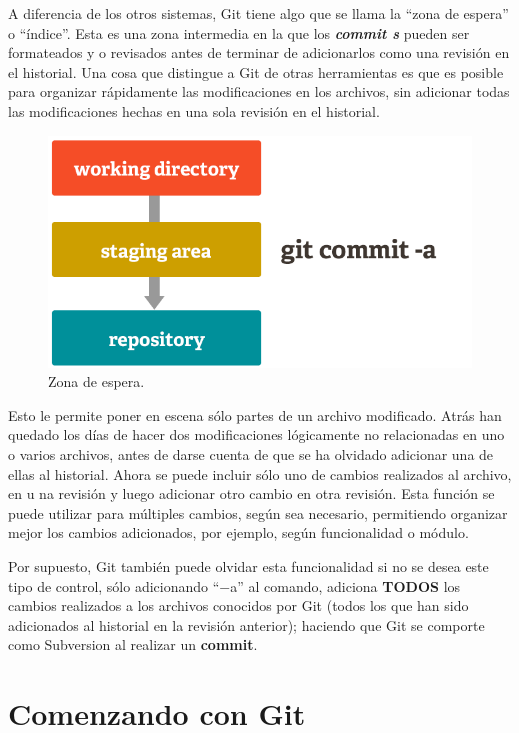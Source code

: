\documentclass[12pt, spanish, oneside, onecolumn, a4paper]{report}
\begin{document}
A diferencia de los otros sistemas, Git tiene algo que se llama la ``zona de espera'' o ``índice''. Esta es una zona intermedia en la que los \textbf{\emph{commit s}} pueden ser formateados y o revisados antes de terminar de adicionarlos como una revisión en el historial. Una cosa que distingue a Git de otras herramientas es que es posible para organizar rápidamente las modificaciones en los archivos, sin adicionar todas las modificaciones hechas en una sola revisión en el historial. 

\begin{figure} 
  \begin{center} 
    \includegraphics[width=.6\textwidth,keepaspectratio=true]{index2.png} 
  \end{center} 
  \caption{Zona de espera.} 
\end{figure}

Esto le permite poner en escena sólo partes de un archivo modificado. Atrás han quedado los días de hacer dos modificaciones lógicamente no relacionadas en uno o varios archivos, antes de darse cuenta de que se ha olvidado adicionar una de ellas al historial. Ahora se puede incluir sólo uno de cambios realizados al archivo, en u na revisión y luego adicionar otro cambio en otra revisión. Esta función se puede utilizar para múltiples cambios, según sea necesario, permitiendo organizar mejor los cambios adicionados, por ejemplo, según funcionalidad o módulo.

Por supuesto, Git también puede olvidar esta funcionalidad si no se desea este tipo de control, sólo adicionando ``$-$a'' al comando, adiciona \textbf{TODOS} los cambios realizados a los archivos conocidos por Git (todos los que han sido adicionados al historial en la revisión anterior); haciendo que Git se comporte como Subversion al realizar un \textbf{commit}. 

\chapter{Comenzando con Git} 
\label{chap:gettingstarted} 
\end{document}
